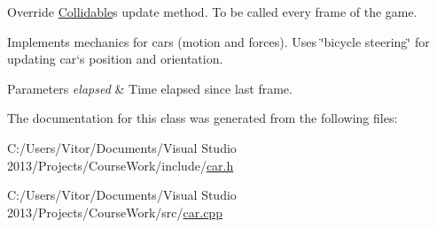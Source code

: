 Override \hyperlink{class_collidable}{Collidable}\textquotesingle{}s update method. To be called every frame of the game. 

Implements mechanics for cars (motion and forces). Uses \char`\"{}bicycle steering\char`\"{} for updating car`s position and orientation.


\begin{DoxyParams}{Parameters}
{\em elapsed} & Time elapsed since last frame. \\
\hline
\end{DoxyParams}


The documentation for this class was generated from the following files\+:\begin{DoxyCompactItemize}
\item 
C\+:/\+Users/\+Vitor/\+Documents/\+Visual Studio 2013/\+Projects/\+Course\+Work/include/\hyperlink{car_8h}{car.\+h}\item 
C\+:/\+Users/\+Vitor/\+Documents/\+Visual Studio 2013/\+Projects/\+Course\+Work/src/\hyperlink{car_8cpp}{car.\+cpp}\end{DoxyCompactItemize}
